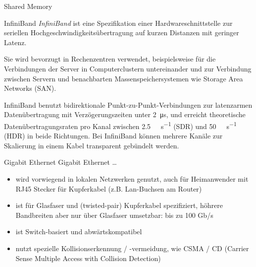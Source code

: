 \begin{defi}{Shared Memory}
    \begin{defi}{InfiniBand}
        \emph{InfiniBand} ist eine Spezifikation einer Hardwareschnittstelle zur seriellen Hochgeschwindigkeitsübertragung auf kurzen Distanzen mit geringer Latenz.

        Sie wird bevorzugt in Rechenzentren verwendet, beispielsweise für die Verbindungen der Server in Computerclustern untereinander und zur Verbindung zwischen Servern und benachbarten Massenspeichersystemen wie Storage Area Networks (SAN).

        InfiniBand benutzt bidirektionale Punkt-zu-Punkt-Verbindungen zur latenzarmen Datenübertragung mit Verzögerungszeiten unter \SI{2}{\micro\second}, und erreicht theoretische Datenübertragungsraten pro Kanal zwischen \SI{2,5}{\giga\bit\per\second} (SDR) und \SI{50}{\giga\bit\per\second} (HDR) in beide Richtungen.
        Bei InfiniBand können mehrere Kanäle zur Skalierung in einem Kabel transparent gebündelt werden.
    \end{defi}

    \begin{defi}{Gigabit Ethernet}
        Gigabit Ethernet \ldots
        \begin{itemize}[\ldots]
            \item wird vorwiegend in lokalen Netzwerken genutzt,
            auch für Heimanwender mit RJ45 Stecker für Kupferkabel (z.B. Lan-Buchsen am Router)
            \item ist für Glasfaser und (twisted-pair) Kupferkabel spezifiziert,
            höhrere Bandbreiten aber nur über Glasfaser umsetzbar: bis zu 100 Gb/s
            \item ist Switch-basiert und abwärtskompatibel
            \item nutzt spezielle Kollisionserkennung / -vermeidung,
            wie CSMA / CD (Carrier Sense Multiple Access with Collision Detection)
        \end{itemize}
    \end{defi}


\end{defi}

